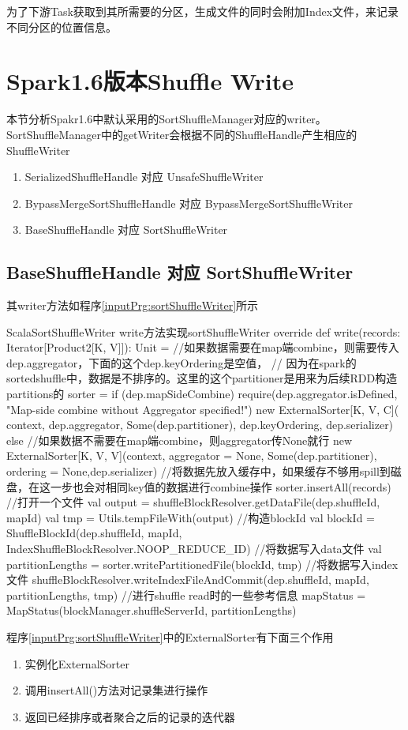 为了下游Task获取到其所需要的分区，生成文件的同时会附加Index文件，来记录不同分区的位置信息。
\section{Spark1.6版本Shuffle Write}
本节分析Spakr1.6中默认采用的SortShuffleManager对应的writer。SortShuffleManager中的getWriter会根据不同的ShuffleHandle产生相应的ShuffleWriter
\begin{enumerate}[\bfseries 1]
	\item SerializedShuffleHandle 对应 UnsafeShuffleWriter
	\item BypassMergeSortShuffleHandle 对应 BypassMergeSortShuffleWriter
	\item BaseShuffleHandle 对应 SortShuffleWriter
\end{enumerate}
\subsection{BaseShuffleHandle 对应 SortShuffleWriter}
其writer方法如程序\ref{inputPrg:sortShuffleWriter}所示
\begin{codeInput}{Scala}{SortShuffleWriter write方法实现}{sortShuffleWriter}
override def write(records: Iterator[Product2[K, V]]): Unit = {
  //如果数据需要在map端combine，则需要传入dep.aggregator，下面的这个dep.keyOrdering是空值，
  // 因为在spark的sortedshuffle中，数据是不排序的。这里的这个partitioner是用来为后续RDD构造partitions的
  sorter = if (dep.mapSideCombine) {
    require(dep.aggregator.isDefined, "Map-side combine without Aggregator specified!")
    new ExternalSorter[K, V, C](
    context, dep.aggregator, Some(dep.partitioner), dep.keyOrdering, dep.serializer)
  } else {
    //如果数据不需要在map端combine，则aggregator传None就行
    new ExternalSorter[K, V, V](context, aggregator = None, Some(dep.partitioner), ordering = None,dep.serializer)
  }
  //将数据先放入缓存中，如果缓存不够用spill到磁盘，在这一步也会对相同key值的数据进行combine操作
  sorter.insertAll(records)
  //打开一个文件
  val output = shuffleBlockResolver.getDataFile(dep.shuffleId, mapId)
  val tmp = Utils.tempFileWith(output)
  //构造blockId
  val blockId = ShuffleBlockId(dep.shuffleId, mapId, IndexShuffleBlockResolver.NOOP_REDUCE_ID)
  //将数据写入data文件
  val partitionLengths = sorter.writePartitionedFile(blockId, tmp)
  //将数据写入index文件
  shuffleBlockResolver.writeIndexFileAndCommit(dep.shuffleId, mapId, partitionLengths, tmp)
  //进行shuffle read时的一些参考信息
  mapStatus = MapStatus(blockManager.shuffleServerId, partitionLengths)
}
\end{codeInput}
程序\ref{inputPrg:sortShuffleWriter}中的ExternalSorter有下面三个作用
\begin{enumerate}
	\item 实例化ExternalSorter
	\item 调用insertAll()方法对记录集进行操作
	\item 返回已经排序或者聚合之后的记录的迭代器
\end{enumerate}
